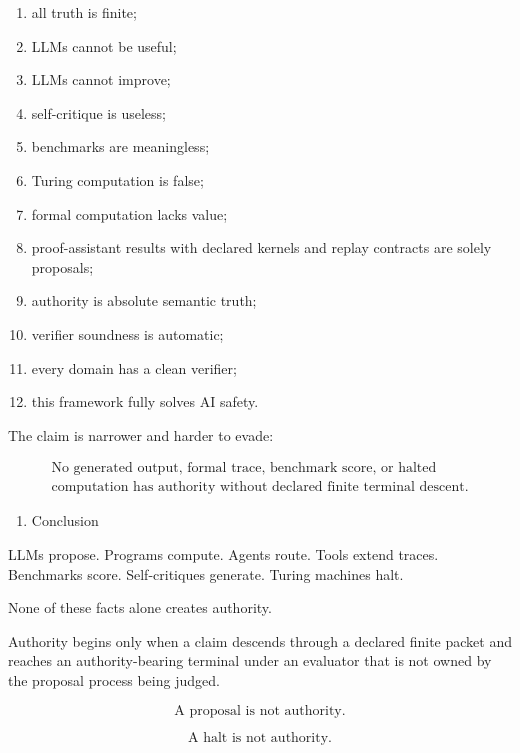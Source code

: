 \documentclass[
  10pt,
]{article}
\providecommand{\tightlist}{%
  \setlength{\itemsep}{0pt}\setlength{\parskip}{0pt}}
\providecommand{\tightlist}{%
  \setlength{\itemsep}{0pt}\setlength{\parskip}{0pt}}
\begin{document}
\begin{enumerate}
\def\labelenumi{\arabic{enumi}.}
\tightlist
\item
  all truth is finite;
\item
  LLMs cannot be useful;
\item
  LLMs cannot improve;
\item
  self-critique is useless;
\item
  benchmarks are meaningless;
\item
  Turing computation is false;
\item
  formal computation lacks value;
\item
  proof-assistant results with declared kernels and replay contracts are solely proposals;
\item
  authority is absolute semantic truth;
\item
  verifier soundness is automatic;
\item
  every domain has a clean verifier;
\item
  this framework fully solves AI safety.
\end{enumerate}

The claim is narrower and harder to evade:

\protect\hypertarget{math-E0169-0230}{}{\[
\boxed{
\begin{gathered}\text{No generated output, formal trace, benchmark score, or halted}\\
\text{computation has authority without declared finite terminal descent.}\end{gathered}
}
\]}

\begin{enumerate}
\def\labelenumi{\arabic{enumi}.}
\setcounter{enumi}{20}
\tightlist
\item
  Conclusion
\end{enumerate}

LLMs propose. Programs compute. Agents route. Tools extend traces. Benchmarks score. Self-critiques generate. Turing machines halt.

None of these facts alone creates authority.

Authority begins only when a claim descends through a declared finite packet and reaches an authority-bearing terminal under an evaluator that is not owned by the proposal process being judged.

\protect\hypertarget{math-E0170-0231}{}{\[
\boxed{
\text{A proposal is not authority.}
}
\]}

\protect\hypertarget{math-E0171-0232}{}{\[
\boxed{
\text{A halt is not authority.}
}
\]}
\end{document}
